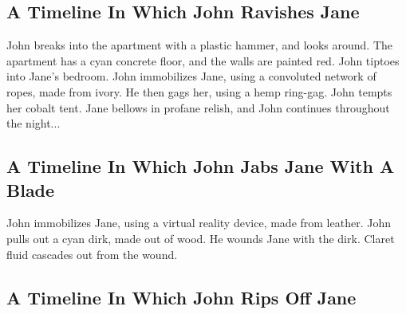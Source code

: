 \documentclass{article}
\begin{document}
\subsection{A Timeline In Which John Ravishes Jane}


John breaks into the apartment with a plastic hammer, and looks around.
The apartment has a cyan concrete floor, and the walls are painted red.
John tiptoes into Jane's bedroom.
John immobilizes Jane, using a convoluted network of ropes, made from ivory.
He then gags her, using a hemp ring{-}gag.
John tempts her cobalt tent.
Jane bellows in profane relish, and John continues throughout the night...
\subsection{A Timeline In Which John Jabs Jane With A Blade}


John immobilizes Jane, using a virtual reality device, made from leather.
John pulls out a cyan dirk, made out of wood.
He wounds Jane with the dirk.
Claret fluid cascades out from the wound.
\subsection{A Timeline In Which John Rips Off Jane}
\end{document}
